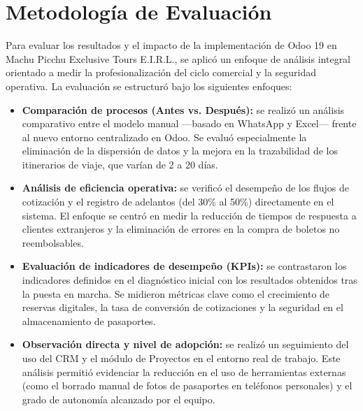 \section{Metodología de Evaluación}

Para evaluar los resultados y el impacto de la implementación de Odoo 19 en Machu Picchu
Exclusive Tours E.I.R.L., se aplicó un enfoque de análisis integral orientado a medir la
profesionalización del ciclo comercial y la seguridad operativa. La evaluación se estructuró
bajo los siguientes enfoques:

\begin{itemize}
    \item \textbf{Comparación de procesos (Antes vs. Después):} se realizó un análisis comparativo entre el modelo manual ---basado en WhatsApp y Excel--- frente al nuevo entorno centralizado en Odoo. Se evaluó especialmente la eliminación de la dispersión de datos y la mejora en la trazabilidad de los itinerarios de viaje, que varían de 2 a 20 días.
    \item \textbf{Análisis de eficiencia operativa:} se verificó el desempeño de los flujos de cotización y el registro de adelantos (del 30\% al 50\%) directamente en el sistema. El enfoque se centró en medir la reducción de tiempos de respuesta a clientes extranjeros y la eliminación de errores en la compra de boletos no reembolsables.
    \item \textbf{Evaluación de indicadores de desempeño (KPIs):} se contrastaron los indicadores definidos en el diagnóstico inicial con los resultados obtenidos tras la puesta en marcha. Se midieron métricas clave como el crecimiento de reservas digitales, la tasa de conversión de cotizaciones y la seguridad en el almacenamiento de pasaportes.
    \item \textbf{Observación directa y nivel de adopción:} se realizó un seguimiento del uso del CRM y el módulo de Proyectos en el entorno real de trabajo. Este análisis permitió evidenciar la reducción en el uso de herramientas externas (como el borrado manual de fotos de pasaportes en teléfonos personales) y el grado de autonomía alcanzado por el equipo.
\end{itemize}
